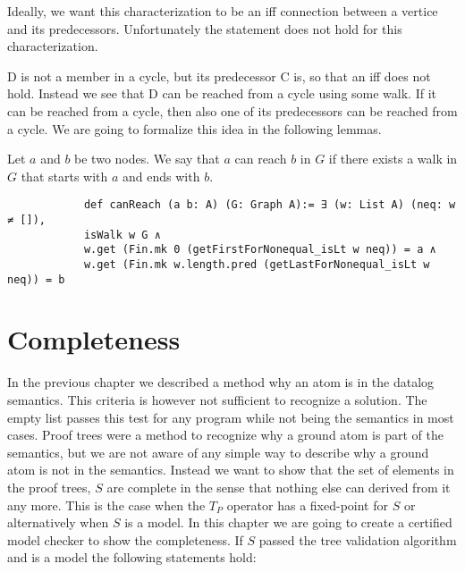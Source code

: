 \documentclass{article}
\begin{document}
        Ideally, we want this characterization to be an iff connection between a vertice and its predecessors. Unfortunately the statement does not hold for this characterization.


        D is not a member in a cycle, but its predecessor C is, so that an iff does not hold. Instead we see that D can be reached from a cycle using some walk. If it can be reached from a cycle, then also one of its predecessors can be reached from a cycle. We are going to formalize this idea in the following lemmas.

        Let $a$ and $b$ be two nodes. We say that $a$ can reach $b$ in $G$ if there exists a walk in $G$ that starts with $a$ and ends with $b$.

        \begin{lstlisting}
            def canReach (a b: A) (G: Graph A):= ∃ (w: List A) (neq: w ≠ []),
            isWalk w G ∧
            w.get (Fin.mk 0 (getFirstForNonequal_isLt w neq)) = a ∧
            w.get (Fin.mk w.length.pred (getLastForNonequal_isLt w neq)) = b
        \end{lstlisting}

        





    \section{Completeness}

    In the previous chapter we described a method why an atom is in the datalog semantics. This criteria is however not sufficient to recognize a solution. The empty list passes this test for any program while not being the semantics in most cases. Proof trees were a method to recognize why a ground atom is part of the semantics, but we are not aware of any simple way to describe why a ground atom is not in the semantics. Instead we want to show that the set of elements in the proof trees, $S$ are complete in the sense that nothing else can derived from it any more. This is the case when the $T_P$ operator has a fixed-point for $S$ or alternatively when $S$ is a model. In this chapter we are going to create a certified model checker to show the completeness. If $S$ passed the tree validation algorithm and is a model the following statements hold:
\end{document}

